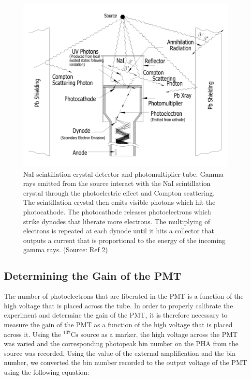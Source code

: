 \documentclass[%
 aip,
rsi,%
 amsmath,amssymb,
 reprint,%
author-numerical,%
]{revtex4-1}
\begin{document}
\begin{figure}[H]
\center
\includegraphics[width=1\linewidth]{lateximages/PMT.png}
\caption{\label{fig:PMT}  NaI scintillation crystal detector and photomultiplier tube. Gamma rays emitted from the source interact with the NaI scintillation crystal through the photoelectric effect and Compton scattering. The scintillation crystal then emits visible photons which hit the photocathode. The photocathode releases photoelectrons which strike dynodes that liberate more electrons. The multiplying of electrons is repeated at each dynode until it hits a collector that outputs a current that is proportional to the energy of the incoming gamma rays. (Source: Ref 2)}
\end{figure}

\subsection{Determining the Gain of the PMT}
The number of photoelectrons that are liberated in the PMT is a function of the high voltage that is placed across the tube. In order to properly calibrate the experiment and determine the gain of the PMT, it is therefore necessary to measure the gain of the PMT as a function of the high voltage that is placed across it. \newline
\indent Using the $\mathrm {  ^ { 137 }Cs }$ source as a marker, the high voltage across the PMT was varied and the corresponding photopeak bin number on the PHA from the source was recorded. Using the value of the external amplification and the bin number, we converted the bin number recorded to the output voltage of the PMT using the following equation:
\end{document}
